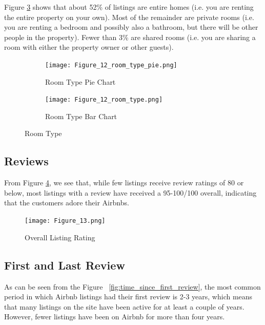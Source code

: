 Figure \ref{fig:room_type} shows that about 52\% of listings are entire homes
(i.e. you are renting the entire property on your own). Most of the remainder
are private rooms (i.e. you are renting a bedroom and possibly also a bathroom,
but there will be other people in the property). Fewer than 3\% are shared rooms
(i.e. you are sharing a room with either the property owner or other guests).

\begin{figure}[H]
    \centering
    \begin{subfigure}[b]{0.48\textwidth}
        \centering
        \caption{Room Type Pie Chart}
        \texttt{[image: Figure\_12\_room\_type\_pie.png]}
        \label{fig:room_type_pie}
    \end{subfigure}
    \begin{subfigure}[b]{0.48\textwidth}
        \centering
        \caption{Room Type Bar Chart}
        \texttt{[image: Figure\_12\_room\_type.png]}
        \label{fig:room_type_bar}
    \end{subfigure}
    \caption{Room Type}
    \label{fig:room_type}
\end{figure}

\subsection{Reviews}

From Figure   \ref{fig:overall-listing}, we see that, while few listings receive
review ratings of 80 or below, most listings with a review have received a
95-100/100 overall,  indicating that the customers adore their Airbnbs.

\begin{figure}[H]\centering
    \caption{Overall Listing Rating}
    \texttt{[image: Figure\_13.png]}
    \label{fig:overall-listing}
\end{figure}

\subsection{First and Last Review}

As can be seen from the Figure ~\ref{fig:time_since_first_review}, the most
common period in which  Airbnb listings had their first review is 2-3 years,
which means that many listings on the site have been active for at least a
couple of years. However,  fewer listings have been on Airbnb for more than four
years.

